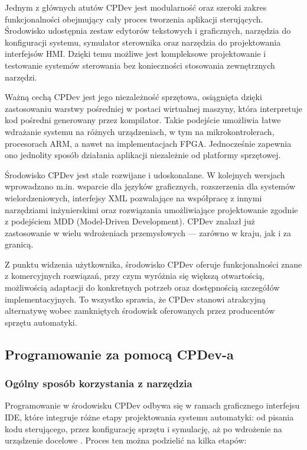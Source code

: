 \documentclass[12pt,twoside]{article}
\begin{document}
Jednym z głównych atutów CPDev jest modularność oraz szeroki zakres funkcjonalności obejmujący cały proces tworzenia aplikacji sterujących. Środowisko udostępnia zestaw edytorów tekstowych i graficznych, narzędzia do konfiguracji systemu, symulator sterownika oraz narzędzia do projektowania interfejsów HMI. Dzięki temu możliwe jest kompleksowe projektowanie i testowanie systemów sterowania bez konieczności stosowania zewnętrznych narzędzi.

Ważną cechą CPDev jest jego niezależność sprzętowa, osiągnięta dzięki zastosowaniu warstwy pośredniej w postaci wirtualnej maszyny, która interpretuje kod pośredni generowany przez kompilator. Takie podejście umożliwia łatwe wdrażanie systemu na różnych urządzeniach, w tym na mikrokontrolerach, procesorach ARM, a nawet na implementacjach FPGA\cite{cpdevFPGA}. Jednocześnie zapewnia ono jednolity sposób działania aplikacji niezależnie od platformy sprzętowej.

Środowisko CPDev jest stale rozwijane i udoskonalane. W kolejnych wersjach wprowadzano m.in. wsparcie dla języków graficznych, rozszerzenia dla systemów wielordzeniowych, interfejsy XML pozwalające na współpracę z innymi narzędziami inżynierskimi oraz rozwiązania umożliwiające projektowanie zgodnie z podejściem MDD (Model-Driven Development). CPDev znalazł już zastosowanie w wielu wdrożeniach przemysłowych — zarówno w kraju, jak i za granicą.

Z punktu widzenia użytkownika, środowisko CPDev oferuje funkcjonalności znane z komercyjnych rozwiązań, przy czym wyróżnia się większą otwartością, możliwością adaptacji do konkretnych potrzeb oraz dostępnością szczegółów implementacyjnych. To wszystko sprawia, że CPDev stanowi atrakcyjną alternatywę wobec zamkniętych środowisk oferowanych przez producentów sprzętu automatyki.
\subsection{Programowanie za pomocą CPDev-a}
\subsubsection{Ogólny sposób korzystania z narzędzia}
Programowanie w środowisku CPDev odbywa się w ramach graficznego interfejsu IDE, które integruje różne etapy projektowania systemu automatyki: od pisania kodu sterującego, przez konfigurację sprzętu i symulację, aż po wdrożenie na urządzenie docelowe \cite{cpdev2009}. Proces ten można podzielić na kilka etapów:
\end{document}
